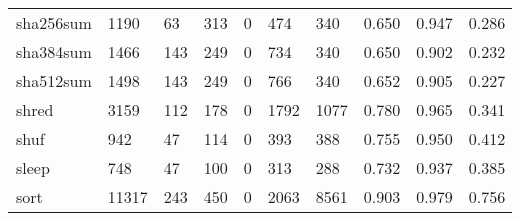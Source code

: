 \begin{longtable}{lp{1.3cm}p{1.3cm}p{1.3cm}p{1.3cm}p{1.3cm}p{1.3cm}p{1.3cm}p{1.3cm}p{1.3cm}}
sha256sum &                   1190 &                                 63 &                               313 &                                0 &                               474 &                             340 &                                0.650 &                                  0.947 &                                0.286 \\
sha384sum &                   1466 &                                143 &                               249 &                                0 &                               734 &                             340 &                                0.650 &                                  0.902 &                                0.232 \\
sha512sum &                   1498 &                                143 &                               249 &                                0 &                               766 &                             340 &                                0.652 &                                  0.905 &                                0.227 \\
shred     &                   3159 &                                112 &                               178 &                                0 &                              1792 &                            1077 &                                0.780 &                                  0.965 &                                0.341 \\
shuf      &                    942 &                                 47 &                               114 &                                0 &                               393 &                             388 &                                0.755 &                                  0.950 &                                0.412 \\
sleep     &                    748 &                                 47 &                               100 &                                0 &                               313 &                             288 &                                0.732 &                                  0.937 &                                0.385 \\
sort      &                  11317 &                                243 &                               450 &                                0 &                              2063 &                            8561 &                                0.903 &                                  0.979 &                                0.756 \\

\end{longtable}
